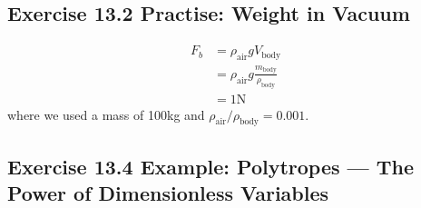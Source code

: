 \documentclass[10pt,a4paper]{book}
\theoremstyle{definition}
\begin{document}
\subsection{Exercise 13.2 Practise: Weight in Vacuum}
\begin{align}
    F_{b}&=\rho_\text{air}gV_\text{body}\\
    &=\rho_\text{air}g\frac{m_\text{body}}{\rho_\text{body}}\\
    &=1\text{N}
\end{align}
where we used a mass of 100kg and $\rho_\text{air}/\rho_\text{body}=0.001$.

\subsection{Exercise 13.4 Example: Polytropes — The Power of Dimensionless Variables}
\end{document}
